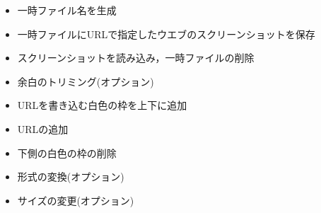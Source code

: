 \documentclass[
]{article}
\providecommand{\tightlist}{%
  \setlength{\itemsep}{0pt}\setlength{\parskip}{0pt}}
\begin{document}
\begin{itemize}
\tightlist
\item
  一時ファイル名を生成\\
\item
  一時ファイルにURLで指定したウエブのスクリーンショットを保存\\
\item
  スクリーンショットを読み込み，一時ファイルの削除\\
\item
  余白のトリミング(オプション)\\
\item
  URLを書き込む白色の枠を上下に追加\\
\item
  URLの追加\\
\item
  下側の白色の枠の削除\\
\item
  形式の変換(オプション)\\
\item
  サイズの変更(オプション)
\end{itemize}
\end{document}
